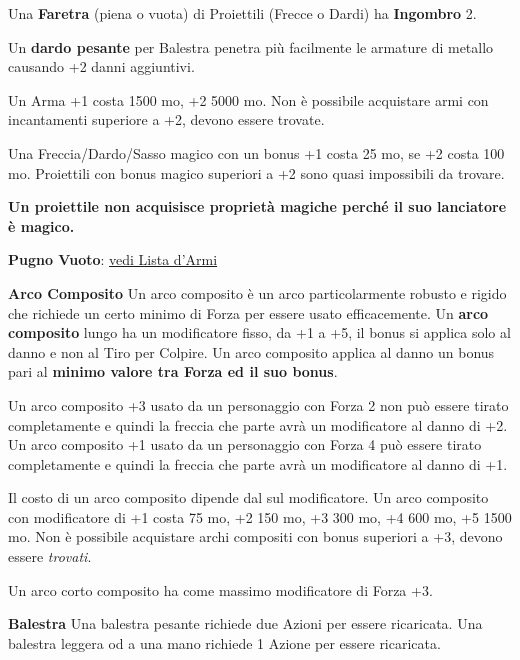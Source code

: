 \medskip

Una \textbf{Faretra} (piena o vuota) di Proiettili (Frecce o Dardi) ha \textbf{Ingombro} 2.

Un \textbf{dardo pesante} per Balestra penetra più facilmente le armature di metallo causando +2 danni aggiuntivi.

\begin{multicols}{2}

Un Arma +1 costa 1500 mo, +2 5000 mo. Non è possibile acquistare armi con incantamenti superiore a +2, devono essere trovate.

Una Freccia/Dardo/Sasso magico con un bonus +1 costa 25 mo, se +2 costa 100 mo. Proiettili con bonus magico superiori a +2 sono quasi impossibili da trovare.

\textbf{Un proiettile non acquisisce proprietà magiche perché il suo lanciatore è magico.}

\medskip

\textbf{Pugno Vuoto}: \hyperlink{pugnovuoto}{vedi Lista d'Armi}

\medskip

\textbf{Arco Composito}
Un arco composito è un arco particolarmente robusto e rigido che richiede un certo minimo di Forza per essere usato efficacemente.
Un \textbf{arco composito} lungo ha un modificatore fisso, da +1 a +5, il bonus si applica solo al danno e non al Tiro per Colpire. Un arco composito applica al danno un bonus pari al \textbf{minimo valore tra Forza ed il suo bonus}.

Un arco composito +3 usato da un personaggio con Forza 2 non può essere tirato completamente e quindi la freccia che parte avrà un modificatore al danno di +2.
Un arco composito +1 usato da un personaggio con Forza 4 può essere tirato completamente e quindi la freccia che parte avrà un modificatore al danno di +1.

Il costo di un arco composito dipende dal sul modificatore.
Un arco composito con modificatore di +1 costa 75 mo, +2 150 mo, +3 300 mo, +4 600 mo, +5 1500 mo. Non è possibile acquistare archi compositi con bonus superiori a +3, devono essere \emph{trovati}.

Un arco corto composito ha come massimo modificatore di Forza +3.

\textbf{Balestra}
Una balestra pesante richiede due Azioni per essere ricaricata. Una balestra leggera od a una mano richiede 1 Azione per essere ricaricata.


\end{multicols}
